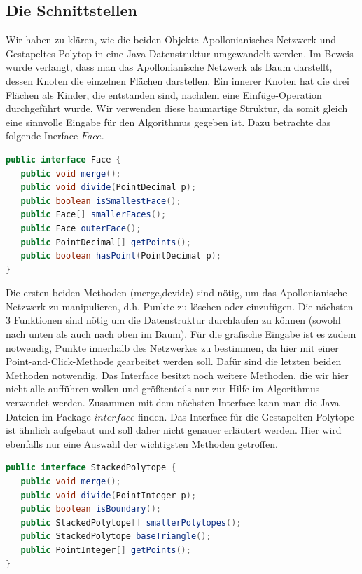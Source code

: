 \subsection*{Die Schnittstellen}
Wir haben zu klären, wie die beiden Objekte Apollonianisches Netzwerk und Gestapeltes Polytop in eine Java-Datenstruktur umgewandelt werden. Im Beweis wurde verlangt, dass man das Apollonianische Netzwerk als Baum darstellt, dessen Knoten die einzelnen Flächen darstellen. Ein innerer Knoten hat die drei Flächen als Kinder, die entstanden sind, nachdem eine Einfüge-Operation durchgeführt wurde. Wir verwenden diese baumartige Struktur, da somit gleich eine sinnvolle Eingabe für den Algorithmus gegeben ist. Dazu betrachte das folgende Inerface $Face$.

\begin{lstlisting}[language=Java, caption={Ausschnitt aus dem Face-Interface}]
public interface Face {
   public void merge();
   public void divide(PointDecimal p);
   public boolean isSmallestFace();
   public Face[] smallerFaces();
   public Face outerFace();
   public PointDecimal[] getPoints();
   public boolean hasPoint(PointDecimal p);
}
\end{lstlisting}

Die ersten beiden Methoden (merge,devide) sind nötig, um das Apollonianische Netzwerk zu manipulieren, d.h. Punkte zu löschen oder einzufügen. Die nächsten 3 Funktionen sind nötig um die Datenstruktur durchlaufen zu können (sowohl nach unten als auch nach oben im Baum). Für die grafische Eingabe ist es zudem notwendig, Punkte innerhalb des Netzwerkes zu bestimmen, da hier mit einer Point-and-Click-Methode gearbeitet werden soll. Dafür sind die letzten beiden Methoden notwendig. Das Interface besitzt noch weitere Methoden, die wir hier nicht alle aufführen wollen und größtenteils nur zur Hilfe im Algorithmus verwendet werden. Zusammen mit dem nächsten Interface kann man die Java-Dateien im Package $interface$ finden. Das Interface für die Gestapelten Polytope ist ähnlich aufgebaut und soll daher nicht genauer erläutert werden. Hier wird ebenfalls nur eine Auswahl der wichtigsten Methoden getroffen.

\begin{lstlisting}[language=Java, caption={Ausschnitt aus dem StackedPolytope-Interface}]
public interface StackedPolytope {
   public void merge();
   public void divide(PointInteger p);
   public boolean isBoundary();
   public StackedPolytope[] smallerPolytopes();
   public StackedPolytope baseTriangle();
   public PointInteger[] getPoints();
}
\end{lstlisting}

